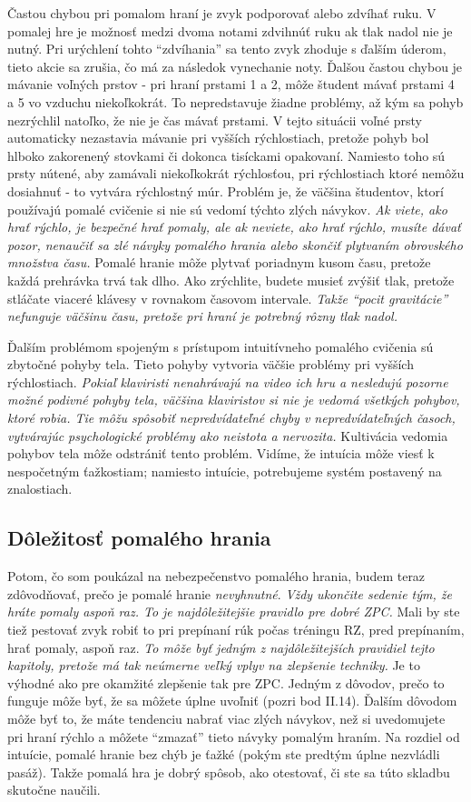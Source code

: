 Častou chybou pri pomalom hraní je zvyk podporovať alebo zdvíhať ruku. V pomalej hre je možnosť medzi dvoma notami zdvihnúť ruku ak tlak nadol nie je nutný. Pri urýchlení tohto “zdvíhania” sa tento zvyk zhoduje s ďalším úderom, tieto akcie sa zrušia, čo má za následok vynechanie noty. Ďalšou častou chybou je mávanie voľných prstov - pri hraní prstami 1 a 2, môže študent mávať prstami 4 a 5 vo vzduchu niekoľkokrát. To nepredstavuje žiadne problémy, až kým sa pohyb nezrýchlil natoľko, že nie je čas mávať prstami. V tejto situácii voľné prsty automaticky nezastavia mávanie pri vyšších rýchlostiach, pretože pohyb bol hlboko zakorenený stovkami či dokonca tisíckami opakovaní. Namiesto toho sú prsty nútené, aby zamávali niekoľkokrát rýchlosťou, pri rýchlostiach ktoré nemôžu dosiahnuť - to vytvára rýchlostný múr. Problém je, že väčšina študentov, ktorí používajú pomalé cvičenie si nie sú vedomí týchto zlých návykov. \emph{Ak viete, ako hrať rýchlo, je bezpečné hrať pomaly, ale ak neviete, ako hrať rýchlo, musíte dávať pozor, nenaučiť sa zlé návyky pomalého hrania alebo skončiť  plytvaním obrovského množstva času.} Pomalé hranie môže plytvať poriadnym kusom času, pretože každá prehrávka trvá tak dlho. Ako zrýchlite, budete musieť zvýšiť tlak, pretože stláčate viaceré klávesy v rovnakom časovom intervale. \emph{Takže “pocit gravitácie” nefunguje väčšinu času, pretože pri hraní je potrebný rôzny tlak nadol.}

Ďalším problémom spojeným s prístupom intuitívneho pomalého cvičenia sú zbytočné pohyby tela. Tieto pohyby vytvoria väčšie problémy pri vyšších rýchlostiach. \emph{Pokiaľ klaviristi nenahrávajú na video ich hru a nesledujú pozorne možné podivné pohyby tela, väčšina klaviristov si nie je vedomá  všetkých pohybov, ktoré robia. Tie môžu spôsobiť nepredvídateľné chyby v nepredvídateľných časoch, vytvárajúc psychologické problémy ako neistota a nervozita.} Kultivácia vedomia pohybov tela môže odstrániť tento problém. Vidíme, že intuícia môže viesť k nespočetným ťažkostiam; namiesto intuície, potrebujeme systém postavený na znalostiach.

\subsection{Dôležitosť pomalého hrania}
Potom, čo som poukázal na nebezpečenstvo pomalého hrania, budem teraz zdôvodňovať, prečo je pomalé hranie \textit{nevyhnutné}. \emph{Vždy ukončite sedenie tým, že hráte pomaly aspoň raz. To je najdôležitejšie pravidlo pre dobré ZPC.} Mali by ste tiež pestovať zvyk robiť to pri prepínaní rúk počas tréningu RZ, pred prepínaním, hrať pomaly, aspoň raz. \emph{To môže byť jedným z najdôležitejších pravidiel tejto kapitoly, pretože má tak neúmerne veľký vplyv na zlepšenie techniky.} Je to výhodné ako pre okamžité zlepšenie tak pre ZPC. Jedným z dôvodov, prečo to funguje môže byť, že sa môžete úplne uvoľniť (pozri bod II.14). Ďalším dôvodom môže byť to, že máte tendenciu nabrať viac zlých návykov, než si uvedomujete pri hraní rýchlo a môžete “zmazať” tieto návyky pomalým hraním. Na rozdiel od intuície, pomalé hranie bez chýb je ťažké (pokým ste predtým úplne nezvládli pasáž). Takže pomalá hra je dobrý spôsob, ako otestovať, či ste sa túto skladbu skutočne naučili.

